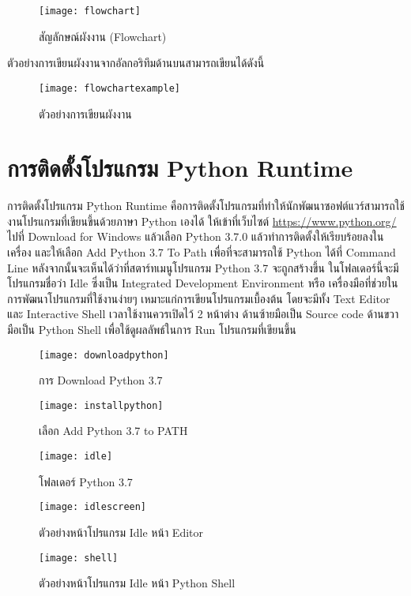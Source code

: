 \begin{figure}[h]
\caption{สัญลักษณ์ผังงาน (Flowchart)}
\texttt{[image: flowchart]}
\centering
\end{figure}

ตัวอย่างการเขียนผังงานจากอัลกอริทึมด้านบนสามารถเขียนได้ดังนี้


\begin{figure}[h]
\caption{ตัวอย่างการเขียนผังงาน}
\texttt{[image: flowchartexample]}
\centering
\end{figure}

\section{การติดตั้งโปรแกรม Python Runtime}

การติดตั้งโปรแกรม Python Runtime คือการติดตั้งโปรแกรมที่ทำให้นักพัฒนาซอฟต์แวร์สามารถใช้งานโปรแกรมที่เขียนขึ้นด้วยภาษา Python เองได้ ให้เข้าที่เว็บไซต์ \url{https://www.python.org/} \cite{Pyt19} ไปที่ Download for Windows แล้วเลือก Python 3.7.0 แล้วทำการติดตั้งให้เรียบร้อยลงในเครื่อง และให้เลือก Add Python 3.7 To Path เพื่อที่จะสามารถใช้ Python ได้ที่ Command Line หลังจากนั้นจะเห็นได้ว่าที่สตาร์ทเมนูโปรแกรม Python 3.7 จะถูกสร้างขึ้น ในโฟลเดอร์นี้จะมีโปรแกรมชื่อว่า Idle ซึ่งเป็น Integrated Development Environment หรือ เครื่องมือที่ช่วยในการพัฒนาโปรแกรมที่ใช้งานง่ายๆ เหมาะแก่การเขียนโปรแกรมเบื้องต้น โดยจะมีทั้ง Text Editor และ Interactive Shell เวลาใช้งานควรเปิดไว้ 2 หน้าต่าง ด้านซ้ายมือเป็น Source code ด้านขวามือเป็น Python Shell เพื่อใช้ดูผลลัพธ์ในการ Run โปรแกรมที่เขียนขึ้น

\begin{figure}[h]
\caption{การ Download Python 3.7}
\texttt{[image: downloadpython]}
\centering

\end{figure}

\begin{figure}[h]
\caption{เลือก Add Python 3.7 to PATH}
\texttt{[image: installpython]}
\centering

\end{figure}


\begin{figure}[h]
\caption{โฟลเดอร์ Python 3.7 }
\texttt{[image: idle]}
\centering

\end{figure}


\begin{figure}[h]
\caption{ตัวอย่างหน้าโปรแกรม Idle หน้า Editor}
\texttt{[image: idlescreen]}
\centering

\end{figure}

\begin{figure}[h]
\caption{ตัวอย่างหน้าโปรแกรม Idle หน้า Python Shell}
\texttt{[image: shell]}
\centering

\end{figure}






